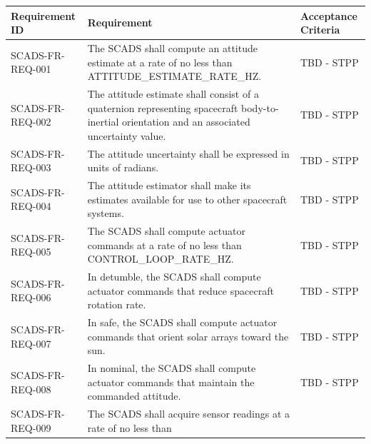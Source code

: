 \documentclass{article}
\begin{document}
\begin{longtable}{|l|p{9cm}|p{5cm}|}
                \hline
                \textbf{Requirement ID} & \textbf{Requirement} & 
                    \textbf{Acceptance Criteria} \\ \hline
                \endhead
                \hline
                \endfoot
                SCADS-FR-REQ-001 & The SCADS shall compute an attitude estimate at 
                                   a rate of no less than 
                                   ATTITUDE\_ESTIMATE\_RATE\_HZ.
                                 & TBD - STPP \\ \hline
                SCADS-FR-REQ-002 & The attitude estimate shall consist of a 
                                   quaternion representing spacecraft 
                                   body-to-inertial orientation and an associated 
                                   uncertainty value.
                                 & TBD - STPP \\ \hline
                SCADS-FR-REQ-003 & The attitude uncertainty shall be expressed in 
                                   units of radians.
                                 & TBD - STPP \\ \hline
                SCADS-FR-REQ-004 & The attitude estimator shall make its estimates 
                                   available for use to other spacecraft systems.
                                 & TBD - STPP \\ \hline
                SCADS-FR-REQ-005 & The SCADS shall compute actuator commands at a 
                                   rate of no less than CONTROL\_LOOP\_RATE\_HZ.
                                 & TBD - STPP \\ \hline
                SCADS-FR-REQ-006 & In detumble, the SCADS shall compute actuator 
                                   commands that reduce spacecraft rotation rate.
                                 & TBD - STPP \\ \hline
                SCADS-FR-REQ-007 & In safe, the SCADS shall compute actuator 
                                   commands that orient solar arrays toward the sun.
                                 & TBD - STPP \\ \hline
                SCADS-FR-REQ-008 & In nominal, the SCADS shall compute actuator 
                                   commands that maintain the commanded attitude.
                                 & TBD - STPP \\ \hline
                SCADS-FR-REQ-009 & The SCADS shall acquire sensor readings at a
                                   rate of no less than 

\end{longtable}
\end{document}
